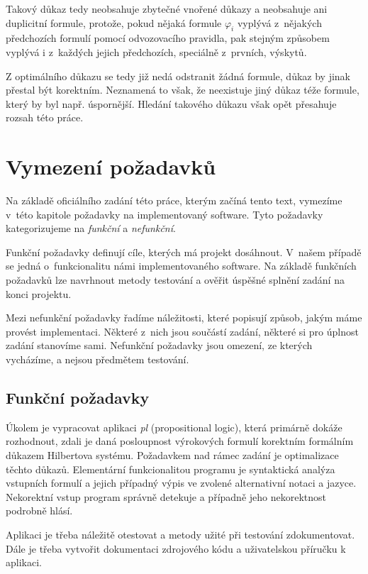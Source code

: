\documentclass[thesis=B,czech,hidelinks]{thesis}[2012/06/26]
\begin{document}
Takový důkaz tedy neobsahuje zbytečné vnořené důkazy a neobsahuje ani duplicitní formule, protože, pokud nějaká formule $\varphi_i$ vyplývá z~nějakých předchozích formulí pomocí odvozovacího pravidla, pak stejným způsobem vyplývá i z~každých jejich předchozích, speciálně z~prvních, výskytů.

Z optimálního důkazu se tedy již nedá odstranit žádná formule, důkaz by jinak přestal být korektním. Neznamená to však, že neexistuje jiný důkaz téže formule, který by byl např. úspornější. Hledání takového důkazu však opět přesahuje rozsah této práce.

%
%
%

\chapter{Vymezení požadavků}

Na základě oficiálního zadání této práce, kterým začíná tento text, vymezíme v~této kapitole požadavky na implementovaný software. Tyto požadavky kategorizujeme na \emph{funkční} a \emph{nefunkční}.

Funkční požadavky definují cíle, kterých má projekt dosáhnout. V~našem případě se jedná o~funkcionalitu námi implementovaného software. Na základě funkčních požadavků lze navrhnout metody testování a ověřit úspěšné splnění zadání na konci projektu.

Mezi nefunkční požadavky řadíme náležitosti, které popisují způsob, jakým máme provést implementaci. Některé z~nich jsou součástí zadání, některé si pro úplnost zadání stanovíme sami. Nefunkční požadavky jsou omezení, ze kterých vycházíme, a nejsou předmětem testování.

\section{Funkční požadavky}

Úkolem je vypracovat aplikaci \emph{pl} (propositional logic), která primárně dokáže rozhodnout, zdali je daná posloupnost výrokových formulí korektním formálním důkazem Hilbertova systému. Požadavkem nad rámec zadání je optimalizace těchto důkazů. Elementární funkcionalitou programu je syntaktická analýza vstupních formulí a jejich případný výpis ve zvolené alternativní notaci a jazyce. Nekorektní vstup program správně detekuje a případně jeho nekorektnost podrobně hlásí.

Aplikaci je třeba náležitě otestovat a metody užité při testování zdokumentovat. Dále je třeba vytvořit dokumentaci zdrojového kódu a uživatelskou příručku k aplikaci.
\end{document}
